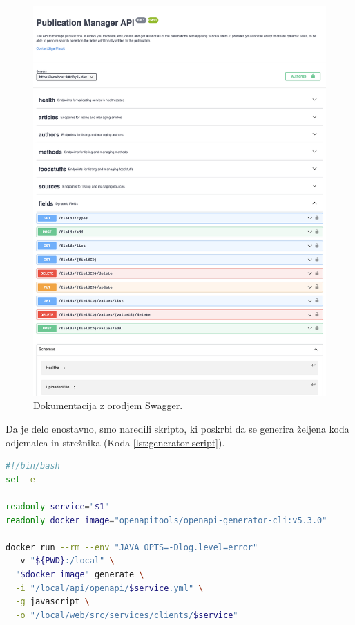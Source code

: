 \newpage
\begin{figure}[h]
\begin{center}
\includegraphics[width=1\textwidth]{slike/documentation.png}
\end{center}
\caption{ Dokumentacija z orodjem Swagger. }
\label{swagger-docs}
\end{figure}
\clearpage


Da je delo enostavno, smo naredili skripto, ki poskrbi da se generira željena koda odjemalca in strežnika (Koda \ref{lst:generator-script}).
\begin{lstlisting}[language=bash, style=mystyle, caption={Skripta, ki poskrbi za generiranje kode za posamezno storitev.},  label=lst:generator-script]
#!/bin/bash
set -e

readonly service="$1"
readonly docker_image="openapitools/openapi-generator-cli:v5.3.0"

docker run --rm --env "JAVA_OPTS=-Dlog.level=error"
  -v "${PWD}:/local" \
  "$docker_image" generate \
  -i "/local/api/openapi/$service.yml" \
  -g javascript \
  -o "/local/web/src/services/clients/$service"
\end{lstlisting}


